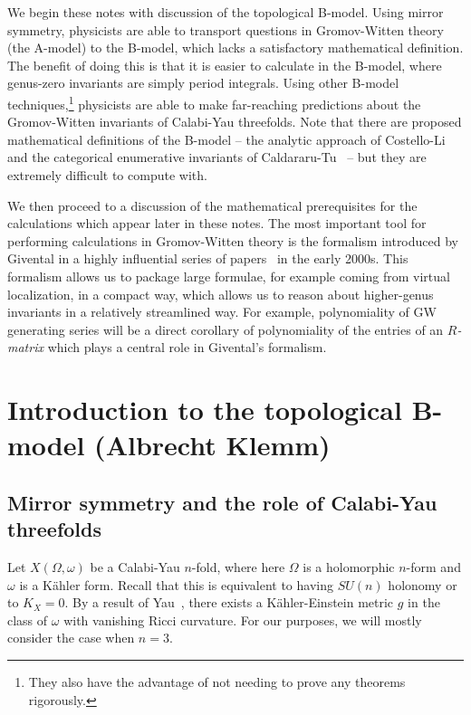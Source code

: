 \documentclass[10pt]{amsart}
\theoremstyle{definition}
\theoremstyle{remark}
\theoremstyle{plain}
\theoremstyle{definition}
\theoremstyle{remark}
\newcommand{\1}{\mathbf{1}}
\newcommand{\2}{\mathbf{2}}
\newcommand{\3}{\mathbf{3}}
\begin{document}
We begin these notes with discussion of the topological B-model. Using mirror symmetry, physicists are able to transport questions in Gromov-Witten theory (the A-model) to the B-model, which lacks a satisfactory mathematical definition. The benefit of doing this is that it is easier to calculate in the B-model, where genus-zero invariants are simply period integrals. Using other B-model techniques,\footnote{They also have the advantage of not needing to prove any theorems rigorously.} physicists are able to make far-reaching predictions about the Gromov-Witten invariants of Calabi-Yau threefolds. Note that there are proposed mathematical definitions of the B-model -- the analytic approach of Costello-Li~\cite{mathbcov1,mathbcov2} and the categorical enumerative invariants of Caldararu-Tu~\cite{cei} -- but they are extremely difficult to compute with.

We then proceed to a discussion of the mathematical prerequisites for the calculations which appear later in these notes. The most important tool for performing calculations in Gromov-Witten theory is the formalism introduced by Givental in a highly influential series of papers~\cite{ssfrobhg,virasorofanotoric,symplfrob} in the early 2000s. This formalism allows us to package large formulae, for example coming from virtual localization, in a compact way, which allows us to reason about higher-genus invariants in a relatively streamlined way. For example, polynomiality of GW generating series will be a direct corollary of polynomiality of the entries of an \textit{$R$-matrix} which plays a central role in Givental's formalism.

\section{Introduction to the topological B-model (Albrecht Klemm)}%
\label{sec:Introduction to the topological B-model (Albrecht Klemm)}

\subsection{Mirror symmetry and the role of Calabi-Yau threefolds}%
\label{sub:Mirror symmetry and the role of Calabi-Yau threefolds}


Let $X(\Omega, \omega)$ be a Calabi-Yau $n$-fold, where here $\Omega$ is a holomorphic $n$-form and $\omega$ is a K\"ahler form. Recall that this is equivalent to having $SU(n)$ holonomy or to $K_X = 0$. By a result of Yau~\cite{calabiconj}, there exists a K\"ahler-Einstein metric $g$ in the class of $\omega$ with vanishing Ricci curvature. For our purposes, we will mostly consider the case when $n=3$.
\end{document}
